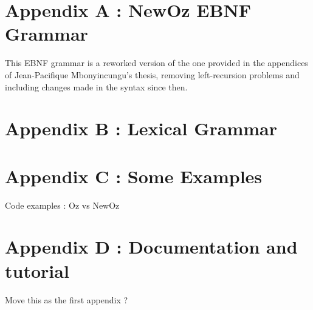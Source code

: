 
\section*{Appendix A : NewOz EBNF Grammar}\label{sec:appendix-grammar}
This EBNF grammar is a reworked version of the one provided in the appendices of Jean-Pacifique Mbonyincungu's thesis,
removing left-recursion problems and including changes made in the syntax since then.


\section*{Appendix B : Lexical Grammar}\label{sec:appendix-lexical-grammar}


\section*{Appendix C : Some Examples}\label{sec:appendix-examples}
Code examples : Oz vs NewOz

\section*{Appendix D : Documentation and tutorial}\label{sec:appendix-doc}
Move this as the first appendix ?